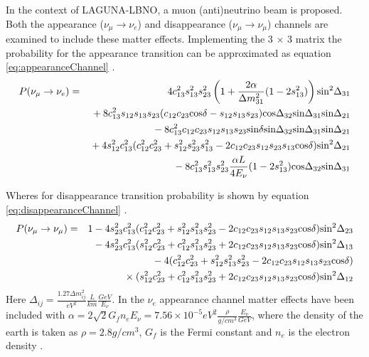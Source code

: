 In the context of LAGUNA-LBNO, a muon (anti)neutrino beam is proposed. Both the appearance ($\nu_{\mu} \to \nu_{e}$) and disappearance ($\nu_{\mu} \to \nu_{\mu}$) channels are examined to include these matter effects. Implementing the 3 $\times$ 3 matrix the probability for the appearance transition can be approximated as equation \ref{eq:appearanceChannel} \cite{internalT2K}.
\begin{eqnarray}
P(\nu_{\mu} \to \nu_{e}) & = & 4c^{2}_{13}s^{2}_{13}s^{2}_{23}\left(1 + \frac{2\alpha}{\textstyle \Delta m^{2}_{31}}(1 - 2s^{2}_{13})\right) \textrm{sin}^{2} \Delta_{31}  \notag{}\\
&& {} + 8c^{2}_{13}s_{12}s_{13}s_{23}(c_{12}c_{23} \textrm{cos} \delta - s_{12}s_{13}s_{23})\textrm{cos} \Delta_{32} \textrm{sin} \Delta_{31}\textrm{sin} \Delta_{21}   \notag{}\\
&& {} - 8c^{2}_{13}c_{12}c_{23}s_{12}s_{13}s_{23} \textrm{sin} \delta \textrm{sin} \Delta_{32} \textrm{sin} \Delta_{31}\textrm{sin} \Delta_{21}  \notag{} \\
&& {} + 4s^{2}_{12}c^{2}_{13}(c^{2}_{12}c^{2}_{23} + s^{2}_{12}s^{2}_{23}s^{2}_{13} - 2c_{12}c_{23}s_{12}s_{23}s_{13} \textrm{cos} \delta) \textrm {sin}^{2} \Delta_{21} \notag{}\\
&& {} - 8c^{2}_{13}s^{2}_{13}s^{2}_{23} \frac{\alpha L}{\textstyle 4E_{\nu}}(1 - 2s^{2}_{13}) \textrm{cos} \Delta_{32} \textrm{sin} \Delta_{31} 
\label{eq:appearanceChannel}
\end{eqnarray}

Wheres for disappearance transition probability is shown by equation \ref{eq:disappearanceChannel} \cite{georgeThesis}.
\begin{eqnarray}
P(\nu_{\mu} \to \nu_{\mu}) & = & 1 - 4s^{2}_{23}c^{2}_{13}(c^{2}_{12}c^{2}_{23} + s^{2}_{12} s^{2}_{13}s^{2}_{23} - 2c_{12}c_{23}s_{12}s_{13}s_{23} \textrm{cos}  \delta) \textrm{sin}^{2} \Delta_{23}  \notag{}\\
&& {} - 4s^{2}_{23}c^{2}_{13}(s^{2}_{12}c^{2}_{23} + c^{2}_{12} s^{2}_{13}s^{2}_{23} + 2c_{12}c_{23}s_{12}s_{13}s_{23} \textrm{cos}  \delta)  \textrm{sin}^{2} \Delta_{13} \notag{} \\
&& {} - 4(c^{2}_{12}c^{2}_{23} + s^{2}_{12} s^{2}_{13}s^{2}_{23} - 2c_{12}c_{23}s_{12}s_{13}s_{23} \textrm{cos}  \delta)  \notag{}\\
&& {} \times (s^{2}_{12}c^{2}_{23} + c^{2}_{12} s^{2}_{13}s^{2}_{23} + 2c_{12}c_{23}s_{12}s_{13}s_{23} \textrm{cos}  \delta)  \textrm{sin}^{2} \Delta_{12} 
\label{eq:disappearanceChannel}
\end{eqnarray}
Here $\Delta_{ij} = \frac{1.27\Delta m^{2}_{ij}}{eV^{2}}\frac{L}{km}\frac{GeV}{E_{\nu}}$.
In the $\nu_e$ appearance channel matter effects have been included with $\alpha = 2 \sqrt{2}G_{f}n_{e}E_{\nu} = 7.56 \times 10^{-5} eV^{2} \frac{\rho}{g / cm^{3}} \frac{E_{\nu}}{GeV}$, where the density of the earth is taken as $\rho = 2.8 g/cm^{3}$, $G_{f}$ is the Fermi constant and $n_{e}$ is the electron density \cite{georgeThesis} \cite{internalT2K}. 

